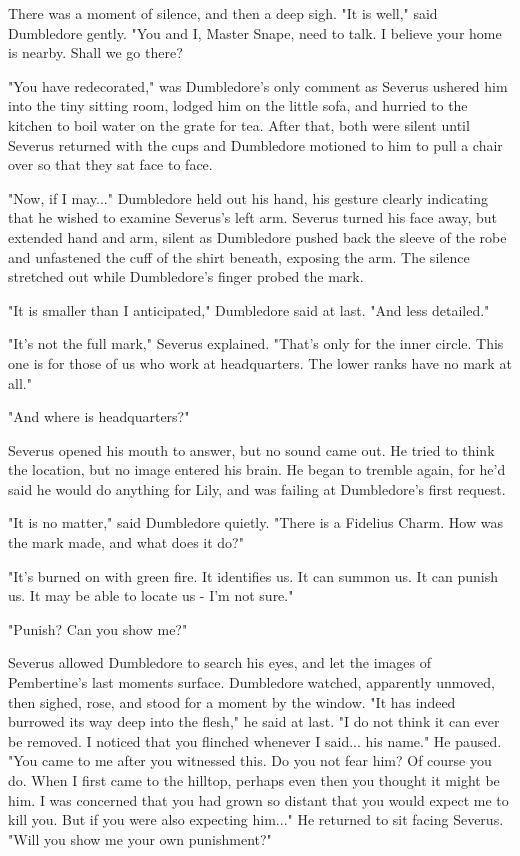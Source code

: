 \documentclass[a4paper,11pt]{article}
\begin{document}
There was a moment of silence, and then a deep sigh. "It is well," said Dumbledore gently. "You and I, Master Snape, need to talk. I believe your home is nearby. Shall we go there?

"You have redecorated," was Dumbledore's only comment as Severus ushered him into the tiny sitting room, lodged him on the little sofa, and hurried to the kitchen to boil water on the grate for tea. After that, both were silent until Severus returned with the cups and Dumbledore motioned to him to pull a chair over so that they sat face to face.

"Now, if I may..." Dumbledore held out his hand, his gesture clearly indicating that he wished to examine Severus's left arm. Severus turned his face away, but extended hand and arm, silent as Dumbledore pushed back the sleeve of the robe and unfastened the cuff of the shirt beneath, exposing the arm. The silence stretched out while Dumbledore's finger probed the mark.

"It is smaller than I anticipated," Dumbledore said at last. "And less detailed."

"It's not the full mark," Severus explained. "That's only for the inner circle. This one is for those of us who work at headquarters. The lower ranks have no mark at all."

"And where is headquarters?"

Severus opened his mouth to answer, but no sound came out. He tried to think the location, but no image entered his brain. He began to tremble again, for he'd said he would do anything for Lily, and was failing at Dumbledore's first request.

"It is no matter," said Dumbledore quietly. "There is a Fidelius Charm. How was the mark made, and what does it do?"

"It's burned on with green fire. It identifies us. It can summon us. It can punish us. It may be able to locate us - I'm not sure."

"Punish? Can you show me?"

Severus allowed Dumbledore to search his eyes, and let the images of Pembertine's last moments surface. Dumbledore watched, apparently unmoved, then sighed, rose, and stood for a moment by the window. "It has indeed burrowed its way deep into the flesh," he said at last. "I do not think it can ever be removed. I noticed that you flinched whenever I said... his name." He paused. "You came to me after you witnessed this. Do you not fear him? Of course you do. When I first came to the hilltop, perhaps even then you thought it might be him. I was concerned that you had grown so distant that you would expect me to kill you. But if you were also expecting him..." He returned to sit facing Severus. "Will you show me your own punishment?"
\end{document}
